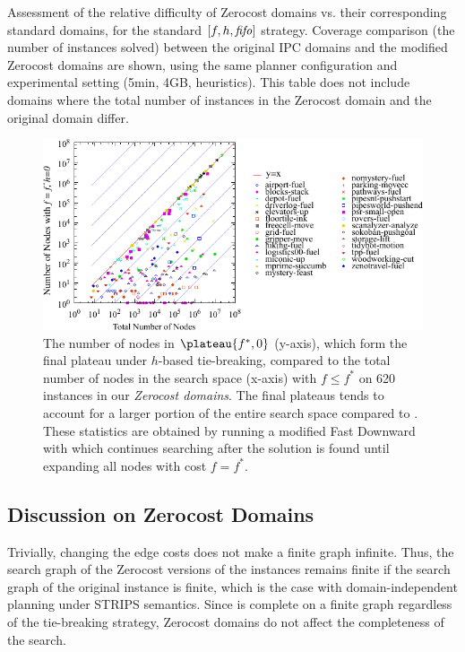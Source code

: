 
\begin{table}[htbp]
 \centering
 
 \caption{
 Assessment of the relative difficulty of Zerocost domains vs. their corresponding standard domains, for the standard $[f,h,{\text{\textit{fifo}}}]$ strategy.
 Coverage comparison (the number of instances solved) 
 between the original IPC domains and the modified Zerocost domains are shown, 
 using the same planner configuration and experimental setting (5min, 4GB, \lmcut heuristics).
 This table does not include domains where the total number of instances
 in the Zerocost domain  and the original domain differ. 
 }
 \label{tbl:lmcut-zerocost-std}
\end{table}

\begin{figure}[htbp]
  \centering
  \includegraphics{tables/aaai16-frontier/zerocost/lmcut_frontier-front.pdf}
  \caption{
 The number of nodes in $\plateau{f^*, 0}$ (y-axis), which form
  the final plateau under $h$-based tie-breaking, compared to
 the total number of nodes in the search space (x-axis) with
 $f\leq f^*$ on 620 instances in our \emph{Zerocost domains}.
 The final plateaus tends to account for a larger portion of the
 entire search space compared to .
 These statistics are obtained by running a modified Fast Downward with
 \lmcut which continues searching after the solution is found
 until expanding all nodes with cost $f=f^*$.
 }
 \label{fig:plateau-zerocost}
\end{figure}

\subsection{Discussion on Zerocost Domains}

Trivially, changing the edge costs does not make a finite graph infinite.
Thus, 
the search graph of the Zerocost versions of the instances remains finite
if the search graph of the original instance is finite,
which is the case with domain-independent planning under STRIPS semantics.
Since \astar is complete on a finite graph regardless of the tie-breaking strategy,
Zerocost domains do not affect the completeness of the search.

